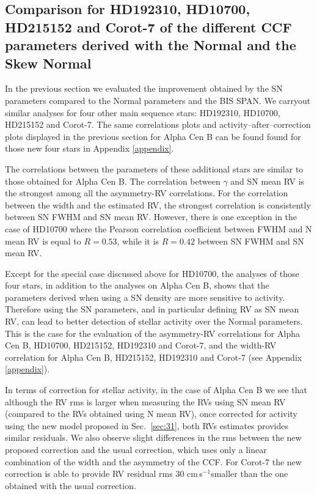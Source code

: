 \documentclass{aa}
\def\cms{\hbox{\,cm\,s$^{-1}$}}       %
\begin{document}
\subsection{Comparison for HD192310, HD10700, HD215152 and Corot-7 of the different CCF parameters derived with the Normal and the Skew Normal} \label{sec:real_data_other_stars}

In the previous section we evaluated the improvement obtained by the SN parameters compared to the Normal parameters and the BIS SPAN. We carryout similar analyses for four other main sequence stars: HD192310, HD10700, HD215152 and Corot-7. The same correlations plots and activity--after--correction plots displayed in the previous section for Alpha Cen B can be found found for those new four stars in Appendix \ref{appendix}.

The correlations between the parameters of these additional stars are similar to those obtained for Alpha Cen B. The correlation between $\gamma$ and SN mean RV is the strongest among all the asymmetry-RV correlations. For the correlation between the width and the estimated RV, the strongest correlation is consistently between SN FWHM and SN mean RV. However, there is one exception in the case of HD10700 where the Pearson correlation coefficient between FWHM and N mean RV is equal to $R=0.53$, while it is $R=0.42$ between SN FWHM and SN mean RV.

Except for the special case discussed above for HD10700, the analyses of those four stars, in addition to the analyses on Alpha Cen B, shows that the parameters derived when using a SN density are more sensitive to activity.  Therefore using the SN parameters, and in particular defining RV as SN mean RV, can lead to better detection of stellar activity over the Normal parameters. 
This is the case for the evaluation of the asymmetry-RV correlations for  Alpha Cen B, HD10700, HD215152, HD192310 and Corot-7, and the width-RV correlation for Alpha Cen B, HD215152, HD192310 and Corot-7 (see Appendix \ref{appendix}).

In terms of correction for stellar activity, in the case of Alpha Cen B we see that although the RV rms is larger when measuring the RVs using SN mean RV (compared to the RVs obtained using N mean RV), once corrected for activity using the new model proposed in Sec.~\ref{sec:31}, both RVs estimates provides similar residuals. We also observe slight differences in the rms between the new proposed correction and the usual correction, which uses only a linear combination of the width and the asymmetry of the CCF.  For Corot-7 the new correction is able to provide RV residual rms 30\,\cms smaller than the one obtained with the usual correction.
\end{document}
